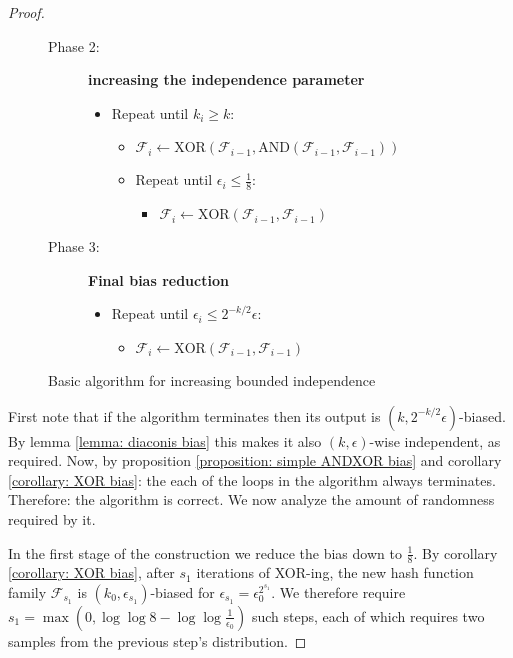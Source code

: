 \documentclass[12pt]{article}
\newcommand{\AND}{\mathrm{AND} }
\newcommand{\XOR}{\mathrm{XOR} }
\newcommand{\F}{\mathcal{F}}
\begin{document}
\begin{proof}
\begin{figure}[H]
\begin{mdframed}
			\begin{description}
				\item[Phase 2:] \textbf{increasing the independence parameter}
				
				\begin{itemize}
					\item Repeat until $k_i \geq k$:
					\begin{itemize}
						\item $\F_i \leftarrow \XOR(\F_{i-1}, \AND(\F_{i-1}, \F_{i-1}))$
						\item Repeat until  $\epsilon_i \leq \frac{1}{8}$:
						\begin{itemize}
							\item $\F_i \leftarrow \XOR(\F_{i-1}, \F_{i-1})$
						\end{itemize}
					\end{itemize}
				\end{itemize}
			\end{description}
			
			\begin{description}
				\item[Phase 3:] \textbf{Final bias reduction}
				
				\begin{itemize}
					\item Repeat until $\epsilon_i \leq 2^{-k/2}\epsilon$:
					\begin{itemize}
						\item $\F_i \leftarrow \XOR(\F_{i-1}, \F_{i-1})$
					\end{itemize}
				\end{itemize}
			\end{description}
			
			\end{mdframed}
			\caption{Basic algorithm for increasing bounded independence} \label{figure: Algorithm}
		\end{figure}
		
		First note that if the algorithm terminates then its output is $(k, 2^{-k/2} \epsilon)$-biased.
		By lemma \ref{lemma: diaconis bias} this makes it also $(k,\epsilon)$-wise independent, as required.
		Now, by proposition \ref{proposition: simple ANDXOR bias} and corollary \ref{corollary: XOR bias}: the each of the loops in the algorithm always terminates.
		Therefore: the algorithm is correct.
		We now analyze the amount of randomness required by it.
		
		In the first stage of the construction we reduce the bias down to $\frac{1}{8}$.
		By corollary \ref{corollary: XOR bias}, after $s_1$ iterations of XOR-ing, the new hash function family $\F_{s_1}$ is $(k_0, \epsilon_{s_1})$-biased for $\epsilon_{s_1} = \epsilon_0^{2^{s_1}}$.
		We therefore require $s_1 = \max (0, \log \log 8 - \log \log \frac{1}{\epsilon_0})$ such steps, each of which requires two samples from the previous step's distribution.
				

\end{proof}
\end{document}
